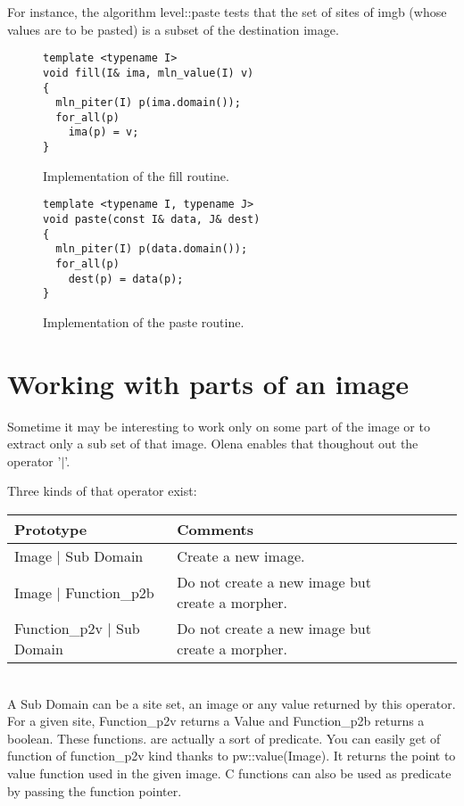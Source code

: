 \documentclass{report}
\begin{document}
For instance, the algorithm level::paste tests that the set of sites of imgb
(whose values are to be pasted) is a subset of the destination image.


\begin{figure}[ht!]
  \begin{lstlisting}[frame=single]
template <typename I>
void fill(I& ima, mln_value(I) v)
{
  mln_piter(I) p(ima.domain());
  for_all(p)
    ima(p) = v;
}
  \end{lstlisting}
  \caption{Implementation of the fill routine.\label{fig:fill_impl}}
\end{figure} 


\begin{figure}[ht!]
  \begin{lstlisting}[frame=single]
template <typename I, typename J>
void paste(const I& data, J& dest)
{
  mln_piter(I) p(data.domain());
  for_all(p)
    dest(p) = data(p);
}
  \end{lstlisting}
  \caption{Implementation of the paste routine.\label{fig:paste_impl}}
\end{figure}

\newpage
\section{Working with parts of an image}

Sometime it may be interesting to work only on some part of the image or to
extract only a sub set of that image. Olena enables that thoughout out the
operator '$|$'.

Three kinds of that operator exist:\\

\begin{tabular}{|l|l|l|l|p{4cm}|}
\hline
Prototype & Comments \\ \hline

Image $|$ Sub Domain & Create a new image.\\ \hline
Image $|$ Function\_p2b & Do not create a new image but create a morpher.\\
\hline
Function\_p2v $|$ Sub Domain & Do not create a new image but create a morpher.\\
\hline
\end{tabular} \\

A Sub Domain can be a site set, an image or any value returned by this
operator.
For a given site, Function\_p2v returns a Value and Function\_p2b returns a
boolean. These functions. are actually a sort of predicate. You can easily get
of function of function\_p2v kind thanks to pw::value(Image). It returns the
point to value function used in the given image. C functions can also be used as
predicate by passing the function pointer.
\end{document}
